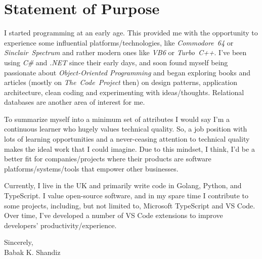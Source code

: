 \documentclass[9pt,a4paper]{extarticle}
\begin{document}


\section*{Statement of Purpose}

I started programming at an early age. This provided me with the opportunity
to experience some influential platforms/technologies, like
\textit{Commodore~64} or \textit{Sinclair~Spectrum} and rather modern ones
like \textit{VB6} or \textit{Turbo~C++}. I've been using \textit{C\#} and
\textit{.NET} since their early days, and soon found myself being passionate
about \textit{Object-Oriented Programming} and began exploring books and
articles (mostly on \textit{The~Code~Project} then) on design patterns,
application architecture, clean coding and experimenting with ideas/thoughts.
Relational databases are another area of interest for me.

To summarize myself into a minimum set of attributes I would say I'm a
continuous learner who hugely values technical quality. So, a job position with
lots of learning opportunities and a never-ceasing attention to technical
quality makes the ideal work that I could imagine. Due to this mindset, I think,
I'd be a better fit for companies/projects where their products are software
platforms/systems/tools that empower other businesses.

Currently, I live in the UK and primarily write code in Golang, Python, and
TypeScript. I value open-source software, and in my spare time I contribute to
some projects, including, but not limited to, Microsoft TypeScript and
VS Code. Over time, I've developed a number of VS Code extensions to improve
developers' productivity/experience.

\vspace{2em}
\noindent
Sincerely, \\
\noindent
Babak K. Shandiz
\end{document}
